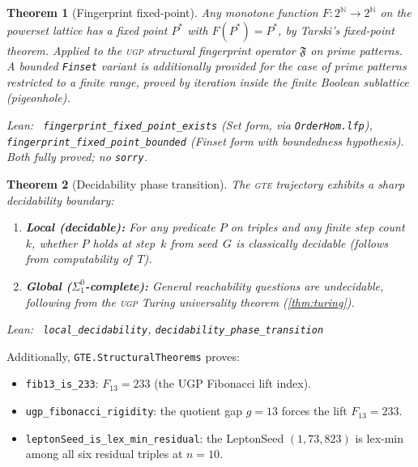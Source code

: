 \documentclass[11pt,a4paper]{article}
\newenvironment{leanref}%
  {\par\smallskip\noindent\begingroup\raggedright\textup{Lean:}~}%
  {\par\endgroup}
\newtheorem{theorem}{Theorem}[section]
\theoremstyle{definition}
\newcommand{\ugp}{\textsc{ugp}}
\newcommand{\gte}{\textsc{gte}}
\begin{document}
\begin{theorem}[Fingerprint fixed-point]\label{thm:fingerprint}
Any monotone function $F : 2^{\mathbb{N}} \to 2^{\mathbb{N}}$ on the powerset lattice
has a fixed point $P^*$ with $F(P^*) = P^*$, by Tarski's fixed-point theorem.
Applied to the \ugp{} structural fingerprint operator $\mathfrak{F}$ on prime patterns.
A bounded \lstinline|Finset| variant is additionally provided for the case of
prime patterns restricted to a finite range, proved by iteration inside the
finite Boolean sublattice (pigeonhole).

\begin{leanref} \lstinline|fingerprint_fixed_point_exists| (Set form, via
\lstinline|OrderHom.lfp|), \lstinline|fingerprint_fixed_point_bounded|
(Finset form with boundedness hypothesis).  Both fully proved; no
\lstinline|sorry|.
\end{leanref}
\end{theorem}

\begin{theorem}[Decidability phase transition]\label{thm:phase}
The \gte{} trajectory exhibits a sharp decidability boundary:
\begin{enumerate}[nosep]
\item \textbf{Local (decidable):} For any predicate $P$ on triples and
  any finite step count~$k$, whether $P$ holds at step~$k$ from seed~$G$ is
  classically decidable (follows from computability of~$T$).
\item \textbf{Global ($\Sigma^0_1$-complete):} General reachability
  questions are undecidable, following from the \ugp{} Turing universality
  theorem (\cref{thm:turing}).
\end{enumerate}

\begin{leanref} \lstinline|local_decidability|, \lstinline|decidability_phase_transition|
\end{leanref}
\end{theorem}

\noindent
Additionally, \texttt{GTE.StructuralTheorems} proves:
\begin{itemize}[nosep]
\item \lstinline|fib13_is_233|: $F_{13} = 233$ (the UGP Fibonacci lift index).
\item \lstinline|ugp_fibonacci_rigidity|: the quotient gap $g = 13$ forces the lift $F_{13} = 233$.
\item \lstinline|leptonSeed_is_lex_min_residual|: the LeptonSeed $(1,73,823)$ is
  lex-min among all six residual triples at $n=10$.
\end{itemize}
\end{document}
